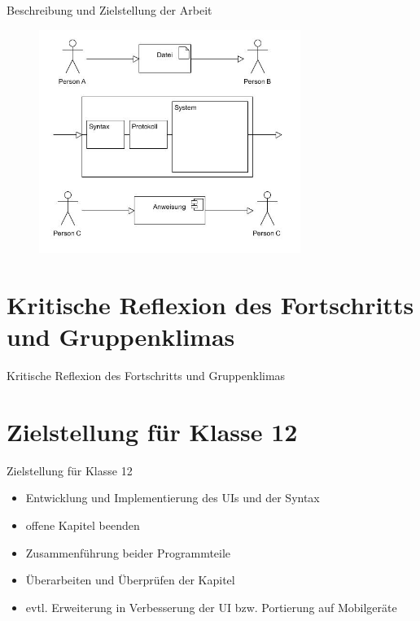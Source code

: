\documentclass{beamer}
\begin{document}
\begin{frame}{Beschreibung und Zielstellung der Arbeit}
\begin{figure}
\includegraphics[width=8.5cm]{s5.jpg}
\end{figure}
\end{frame}


\section{Kritische Reflexion des Fortschritts und Gruppenklimas}

\begin{frame}{Kritische Reflexion des Fortschritts und Gruppenklimas}

\end{frame}


\section{Zielstellung für Klasse 12}
\begin{frame}{Zielstellung für Klasse 12}
\pause
\begin{itemize}
\item Entwicklung und Implementierung des UIs und der Syntax
\pause
\item offene Kapitel beenden
\pause
\item Zusammenführung beider Programmteile
\pause
\item Überarbeiten und Überprüfen der Kapitel
\pause
\item evtl. Erweiterung in Verbesserung der UI bzw. Portierung auf Mobilgeräte
\end{itemize}
\end{frame}
\end{document}
